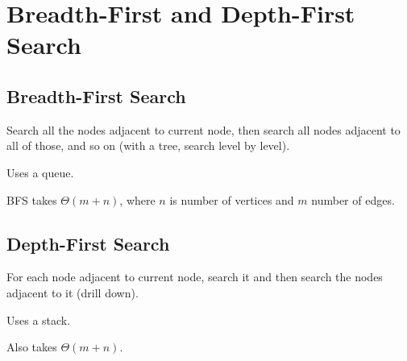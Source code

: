 \section{Breadth-First and Depth-First Search}

\subsection{Breadth-First Search}

Search all the nodes adjacent to current node, then search all nodes adjacent to all of those, and so on (with a tree, search level by level).

Uses a queue.

BFS takes $\Theta(m + n)$, where $n$ is number of vertices and $m$ number of edges.

\subsection{Depth-First Search}

For each node adjacent to current node, search it and then search the nodes adjacent to it (drill down).

Uses a stack.

Also takes $\Theta(m + n)$.

